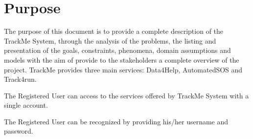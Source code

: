 \section{Purpose}
The purpose of this document is to provide a complete description of the TrackMe System, through the analysis of the problems, the listing and presentation of the goals, constraints, phenomena, domain assumptions and models with the aim of provide to the stakeholders a complete overview of the project. TrackMe provides three main services: Data4Help, AutomatedSOS and Track4run.

\vspace{10mm}

\begin{enumerate}[label={[}G\arabic*{]}]
\item \label{goal:trackme1} The Registered User can access to the services offered by TrackMe System with a single account.
    
    \item \label{goal:trackme2}The Registered User can be recognized by providing his/her username and password.
    
    
\end{enumerate}

